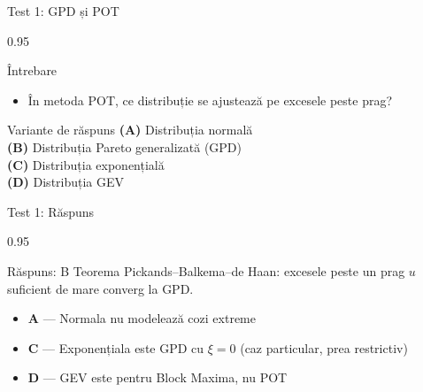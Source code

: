 \documentclass[9pt, aspectratio=169, t]{beamer}
\begin{document}
\begin{frame}{Test 1: GPD și POT}
\begin{cminipage}{0.95\textwidth}
    \begin{alertblock}{Întrebare}
        \begin{itemize}\setlength{\itemsep}{0pt}
            \item În metoda POT, ce distribuție se ajustează pe excesele peste prag?
        \end{itemize}
    \end{alertblock}

    \vspace{0.3cm}

    \begin{block}{Variante de răspuns}
        \textcolor{MainBlue}{\textbf{(A)}} Distribuția normală\\[3pt]
        \textcolor{MainBlue}{\textbf{(B)}} Distribuția Pareto generalizată (GPD)\\[3pt]
        \textcolor{MainBlue}{\textbf{(C)}} Distribuția exponențială\\[3pt]
        \textcolor{MainBlue}{\textbf{(D)}} Distribuția GEV
    \end{block}
\end{cminipage}
\end{frame}

\begin{frame}{Test 1: Răspuns}
\begin{cminipage}{0.95\textwidth}
    \begin{exampleblock}{Răspuns: B}
        Teorema Pickands--Balkema--de Haan: excesele peste un prag $u$ suficient de mare converg la GPD.
    \end{exampleblock}

    \vspace{0.2cm}

    \begin{itemize}\setlength{\itemsep}{0pt}
        \item \textbf{A} --- Normala nu modelează cozi extreme \incorrect
        \item \textbf{C} --- Exponențiala este GPD cu $\xi = 0$ (caz particular, prea restrictiv) \incorrect
        \item \textbf{D} --- GEV este pentru Block Maxima, nu POT \incorrect
    \end{itemize}
\end{cminipage}
\end{frame}
\end{document}
